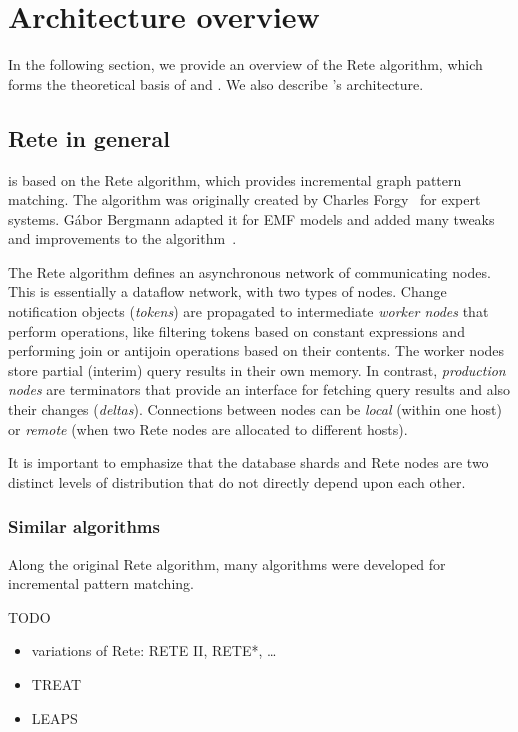\section{Architecture overview}
\label{sec:architecture}

In the following section, we provide an overview of the Rete algorithm, which forms the theoretical basis of \eiq{} and \iqd{}. We also describe \iqd{}'s architecture.

\subsection{Rete in general}
\label{subsec:rete}

\iqd{} is based on the Rete algorithm, which provides incremental graph pattern matching. The algorithm was originally created by Charles Forgy~\cite{Forgy} for expert systems. Gábor Bergmann adapted it for EMF models and added many tweaks and improvements to the algorithm~\cite{BergmannRete}.

The Rete algorithm defines an asynchronous network of communicating nodes. This is essentially a dataflow network, with two types of nodes. Change notification objects (\emph{tokens}) are propagated to intermediate \emph{worker nodes} that perform operations, like filtering tokens based on constant expressions and performing join or antijoin operations based on their contents. The worker nodes store partial (interim) query results in their own memory. In contrast, \emph{production nodes} are terminators that provide an interface for fetching query results and also their changes (\emph{deltas}). Connections between nodes can be \emph{local} (within one host) or \emph{remote} (when two Rete nodes are allocated to different hosts).

It is important to emphasize that the database shards and Rete nodes are two distinct levels of distribution that do not directly depend upon each other.

\subsubsection{Similar algorithms}

Along the original Rete algorithm, many algorithms were developed for incremental pattern matching.

TODO

\begin{itemize}
  \item variations of Rete: RETE II, RETE*, \ldots
  \item TREAT \cite{Miranker:1991:OPT:627280.627434}
  \item LEAPS \cite{Batory:1994:LA:899216}
\end{itemize} 

